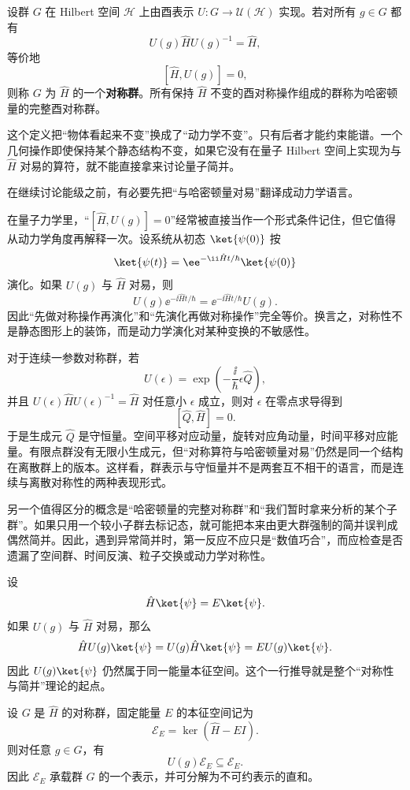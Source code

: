 \begin{definition}[哈密顿量的对称群]
设群 $G$ 在 Hilbert 空间 $\mathcal H$ 上由酉表示 $U:G\to\mathcal U(\mathcal H)$ 实现。若对所有 $g\in G$ 都有
\[
U(g)\hat H U(g)^{-1}=\hat H,
\label{eq:hamiltonian-invariance}
\]
等价地
\[
[\hat H,U(g)]=0,
\]
则称 $G$ 为 $\hat H$ 的一个\textbf{对称群}。所有保持 $\hat H$ 不变的酉对称操作组成的群称为哈密顿量的完整酉对称群。
\label{def:hamiltonian-symmetry-group}
\end{definition}

这个定义把“物体看起来不变”换成了“动力学不变”。只有后者才能约束能谱。一个几何操作即使保持某个静态结构不变，如果它没有在量子 Hilbert 空间上实现为与 $\hat H$ 对易的算符，就不能直接拿来讨论量子简并。

在继续讨论能级之前，有必要先把“与哈密顿量对易”翻译成动力学语言。

在量子力学里，“$[\hat H,U(g)]=0$”经常被直接当作一个形式条件记住，但它值得从动力学角度再解释一次。设系统从初态 $\ket{\psi(0)}$ 按
\[
\ket{\psi(t)}=\ee^{-\ii\hat Ht/\hbar}\ket{\psi(0)}
\]
演化。如果 $U(g)$ 与 $\hat H$ 对易，则
\[
U(g)\ee^{-\ii\hat Ht/\hbar}
=\ee^{-\ii\hat Ht/\hbar}U(g).
\]
因此“先做对称操作再演化”和“先演化再做对称操作”完全等价。换言之，对称性不是静态图形上的装饰，而是动力学演化对某种变换的不敏感性。

对于连续一参数对称群，若
\[
U(\epsilon)=\exp\!\left(-\frac{\ii}{\hbar}\epsilon\hat Q\right),
\]
并且 $U(\epsilon)\hat H U(\epsilon)^{-1}=\hat H$ 对任意小 $\epsilon$ 成立，则对 $\epsilon$ 在零点求导得到
\[
[\hat Q,\hat H]=0.
\]
于是生成元 $\hat Q$ 是守恒量。空间平移对应动量，旋转对应角动量，时间平移对应能量。有限点群没有无限小生成元，但“对称算符与哈密顿量对易”仍然是同一个结构在离散群上的版本。这样看，群表示与守恒量并不是两套互不相干的语言，而是连续与离散对称性的两种表现形式。

另一个值得区分的概念是“哈密顿量的完整对称群”和“我们暂时拿来分析的某个子群”。如果只用一个较小子群去标记态，就可能把本来由更大群强制的简并误判成偶然简并。因此，遇到异常简并时，第一反应不应只是“数值巧合”，而应检查是否遗漏了空间群、时间反演、粒子交换或动力学对称性。

设
\[
\hat H\ket{\psi}=E\ket{\psi}.
\]
如果 $U(g)$ 与 $\hat H$ 对易，那么
\[
\hat H U(g)\ket{\psi}
=U(g)\hat H\ket{\psi}
=E U(g)\ket{\psi}.
\]
因此 $U(g)\ket{\psi}$ 仍然属于同一能量本征空间。这个一行推导就是整个“对称性与简并”理论的起点。

\begin{theorem}[能量本征空间是不变子空间]
设 $G$ 是 $\hat H$ 的对称群，固定能量 $E$ 的本征空间记为
\[
\mathcal E_E=\ker(\hat H-EI).
\]
则对任意 $g\in G$，有
\[
U(g)\mathcal E_E\subseteq \mathcal E_E.
\]
因此 $\mathcal E_E$ 承载群 $G$ 的一个表示，并可分解为不可约表示的直和。
\label{thm:eigenspace-invariant}

\end{theorem}

